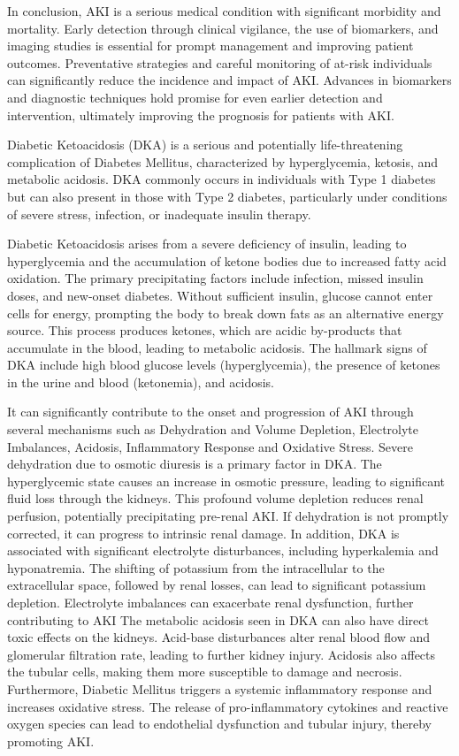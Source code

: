 \documentclass[../main.tex]{subfiles}
\begin{document}
In conclusion, AKI is a serious medical condition with significant morbidity and mortality. 
Early detection through clinical vigilance, the use of biomarkers, and imaging studies is essential for prompt management and improving patient outcomes. 
Preventative strategies and careful monitoring of at-risk individuals can significantly reduce the incidence and impact of AKI. 
Advances in biomarkers and diagnostic techniques hold promise for even earlier detection and intervention, ultimately improving the prognosis for patients with AKI.


Diabetic Ketoacidosis (DKA) is a serious and potentially life-threatening complication of Diabetes Mellitus, characterized by hyperglycemia, ketosis, and metabolic acidosis. 
DKA commonly occurs in individuals with Type 1 diabetes but can also present in those with Type 2 diabetes, particularly under conditions of severe stress, infection, or inadequate insulin therapy. 

Diabetic Ketoacidosis arises from a severe deficiency of insulin, leading to hyperglycemia and the accumulation of ketone bodies due to increased fatty acid oxidation. 
The primary precipitating factors include infection, missed insulin doses, and new-onset diabetes. 
Without sufficient insulin, glucose cannot enter cells for energy, prompting the body to break down fats as an alternative energy source. 
This process produces ketones, which are acidic by-products that accumulate in the blood, leading to metabolic acidosis. 
The hallmark signs of DKA include high blood glucose levels (hyperglycemia), the presence of ketones in the urine and blood (ketonemia), and acidosis.

It can significantly contribute to the onset and progression of AKI through several mechanisms such as Dehydration and Volume Depletion, Electrolyte Imbalances, Acidosis, Inflammatory Response and Oxidative Stress. 
Severe dehydration due to osmotic diuresis is a primary factor in DKA. 
The hyperglycemic state causes an increase in osmotic pressure, leading to significant fluid loss through the kidneys. 
This profound volume depletion reduces renal perfusion, potentially precipitating pre-renal AKI. 
If dehydration is not promptly corrected, it can progress to intrinsic renal damage.
In addition, DKA is associated with significant electrolyte disturbances, including hyperkalemia and hyponatremia. 
The shifting of potassium from the intracellular to the extracellular space, followed by renal losses, can lead to significant potassium depletion. 
Electrolyte imbalances can exacerbate renal dysfunction, further contributing to AKI
The metabolic acidosis seen in DKA can also have direct toxic effects on the kidneys. 
Acid-base disturbances alter renal blood flow and glomerular filtration rate, leading to further kidney injury. 
Acidosis also affects the tubular cells, making them more susceptible to damage and necrosis.
Furthermore, Diabetic Mellitus triggers a systemic inflammatory response and increases oxidative stress. 
The release of pro-inflammatory cytokines and reactive oxygen species can lead to endothelial dysfunction and tubular injury, thereby promoting AKI.
\end{document}
